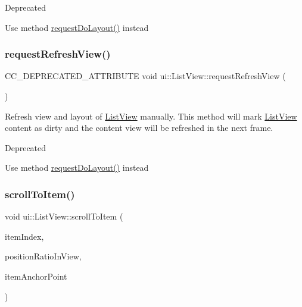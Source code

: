 \begin{DoxyRefDesc}{Deprecated}
\item[\hyperlink{deprecated__deprecated000146}{Deprecated}]Use method \hyperlink{classui_1_1ListView_ad02cdf77d0d8f0dd2586b2bc083d4750}{request\+Do\+Layout()} instead \end{DoxyRefDesc}
\mbox{\label{classui_1_1ListView_a4c022c87acd7ba5ddaaae7a3f0dac170}} 
\subsubsection{\texorpdfstring{request\+Refresh\+View()}{requestRefreshView()}\hspace{0.1cm}{\footnotesize\ttfamily [2/2]}}
{\footnotesize\ttfamily C\+C\+\_\+\+D\+E\+P\+R\+E\+C\+A\+T\+E\+D\+\_\+\+A\+T\+T\+R\+I\+B\+U\+TE void ui\+::\+List\+View\+::request\+Refresh\+View (\begin{DoxyParamCaption}{ }\end{DoxyParamCaption})}



Refresh view and layout of \hyperlink{classui_1_1ListView}{List\+View} manually. This method will mark \hyperlink{classui_1_1ListView}{List\+View} content as dirty and the content view will be refreshed in the next frame. 

\begin{DoxyRefDesc}{Deprecated}
\item[\hyperlink{deprecated__deprecated000381}{Deprecated}]Use method \hyperlink{classui_1_1ListView_ad02cdf77d0d8f0dd2586b2bc083d4750}{request\+Do\+Layout()} instead \end{DoxyRefDesc}
\mbox{\label{classui_1_1ListView_aeb284de1ebb4ae2e30c6c478d6e1d1a0}} 
\subsubsection{\texorpdfstring{scroll\+To\+Item()}{scrollToItem()}\hspace{0.1cm}{\footnotesize\ttfamily [1/2]}}
{\footnotesize\ttfamily void ui\+::\+List\+View\+::scroll\+To\+Item (\begin{DoxyParamCaption}\item[{ssize\+\_\+t}]{item\+Index,  }\item[{const \hyperlink{classVec2}{Vec2} \&}]{position\+Ratio\+In\+View,  }\item[{const \hyperlink{classVec2}{Vec2} \&}]{item\+Anchor\+Point }\end{DoxyParamCaption})}



